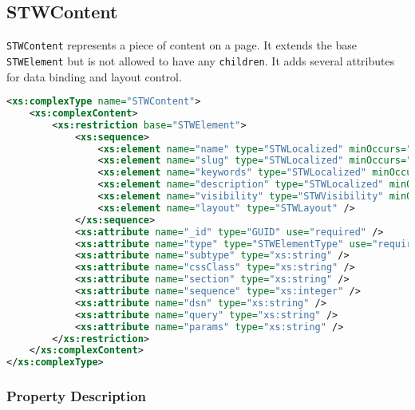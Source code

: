 \subsection{STWContent}

	\texttt{STWContent} represents a piece of content on a page. It extends the base \texttt{STWElement} but is not allowed to have any \texttt{children}. It adds several attributes for data binding and layout control.

\begin{lstlisting}[language=XML,caption={STWContent Type Definition}]
<xs:complexType name="STWContent">
	<xs:complexContent>
		<xs:restriction base="STWElement">
			<xs:sequence>
				<xs:element name="name" type="STWLocalized" minOccurs="1" />
				<xs:element name="slug" type="STWLocalized" minOccurs="1" />
				<xs:element name="keywords" type="STWLocalized" minOccurs="0" />
				<xs:element name="description" type="STWLocalized" minOccurs="0" />
				<xs:element name="visibility" type="STWVisibility" minOccurs="0" />
				<xs:element name="layout" type="STWLayout" />
			</xs:sequence>
			<xs:attribute name="_id" type="GUID" use="required" />
			<xs:attribute name="type" type="STWElementType" use="required" fixed="Content" />
			<xs:attribute name="subtype" type="xs:string" />
			<xs:attribute name="cssClass" type="xs:string" />
			<xs:attribute name="section" type="xs:string" />
			<xs:attribute name="sequence" type="xs:integer" />
			<xs:attribute name="dsn" type="xs:string" />
			<xs:attribute name="query" type="xs:string" />
			<xs:attribute name="params" type="xs:string" />
		</xs:restriction>
	</xs:complexContent>
</xs:complexType>
\end{lstlisting}

\subsubsection{Property Description}

